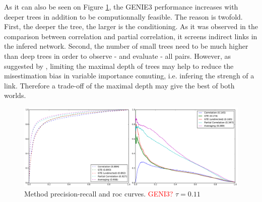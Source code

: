 \documentclass[wcp]{jmlr}
\begin{document}
As it can also be seen on Figure \ref{fig:curves}, the GENIE3 performance
increases with deeper trees in addition to be computionnally feasible. The
reason is twofold. First, the deeper the tree, the larger is the conditioning.
As it was observed in the comparison between correlation and partial
correlation, it screens indirect links in the infered network. Second, the
number of small trees need to be much higher than deep trees in order to
observe - and evaluate - all pairs.  However, as suggested by
\cite{louppe2014understanding}, limiting the maximal depth of trees may help
to reduce the misestimation bias in variable importance comuting, i.e.
infering the strengh of a link. Therefore a trade-off of the maximal depth may give the best of both worlds.


\begin{figure}[bth]
\centering
\includegraphics[width=\linewidth]{images/curves}
\caption{Method precision-recall and roc curves. \textcolor{red}{GENI3?}
         $\tau=0.11$}
\label{fig:curves}
\end{figure}

\end{document}
